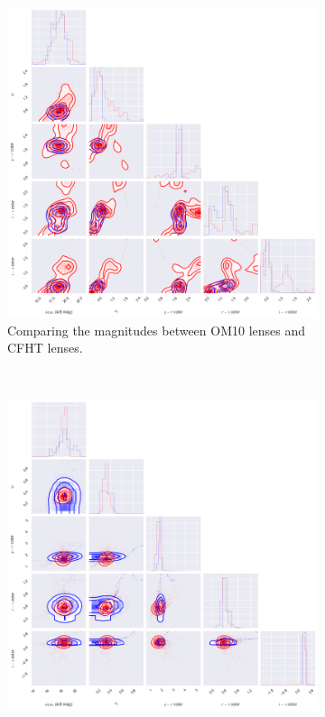 \documentclass[\docopts]{\docclass}
\begin{document}
\begin{figure}
    \centering
    \begin{subfigure}[b]{0.3\textwidth}
        \includegraphics[width=\textwidth]{cfht_om10.png}
        \caption{Comparing the magnitudes between OM10 lenses and CFHT lenses.}
        \label{fig:lens_sdss}
    \end{subfigure}
    ~ %
    \begin{subfigure}[b]{0.3\textwidth}
        \includegraphics[width=\textwidth]{om10_sdss.png}

\end{subfigure}
\end{figure}
\end{document}
